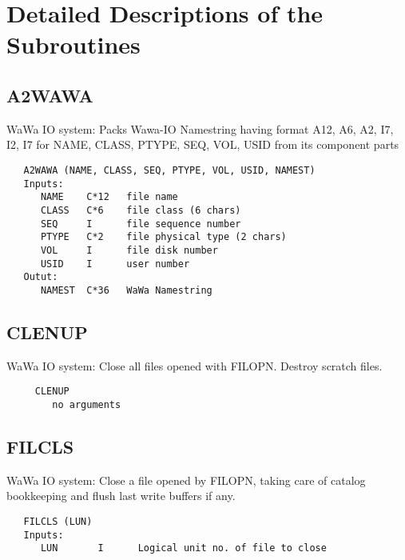 \section{Detailed Descriptions of the Subroutines}

\subsection{A2WAWA}
WaWa IO system: Packs Wawa-IO Namestring having format A12, A6, A2, I7, I2, I7
for NAME, CLASS, PTYPE, SEQ, VOL, USID from its component parts
\begin{verbatim}
   A2WAWA (NAME, CLASS, SEQ, PTYPE, VOL, USID, NAMEST)
   Inputs:
      NAME    C*12   file name
      CLASS   C*6    file class (6 chars)
      SEQ     I      file sequence number
      PTYPE   C*2    file physical type (2 chars)
      VOL     I      file disk number
      USID    I      user number
   Outut:
      NAMEST  C*36   WaWa Namestring
\end{verbatim}

\subsection{CLENUP}
WaWa IO system: Close all files opened with FILOPN.  Destroy scratch files.

\begin{verbatim}
     CLENUP
        no arguments

\end{verbatim}

\subsection{FILCLS}
WaWa IO system: Close a file opened by FILOPN, taking care of
catalog bookkeeping and flush last write buffers if any.
\begin{verbatim}
   FILCLS (LUN)
   Inputs:
      LUN       I      Logical unit no. of file to close

\end{verbatim}

